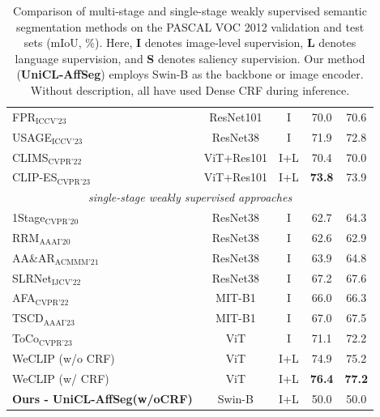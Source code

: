 \begin{table}[!t]
\begin{tabular}{l c c c c}
        FPR$_{\text{ICCV'23}}$~\cite{wsss_fpr}        & ResNet101  & I    & 70.0          & 70.6          \\
        USAGE$_{\text{ICCV'23}}$~\cite{wsss_usage}    & ResNet38   & I    & 71.9          & 72.8          \\
        CLIMS$_{\text{CVPR'22}}$~\cite{wsss_clims}    & ViT+Res101 & I+L  & 70.4          & 70.0          \\
        CLIP-ES$_{\text{CVPR'23}}$~\cite{wsss_clip_es}                       & ViT+Res101 & I+L  & \textbf{73.8} & 73.9          \\
        \hline
        \multicolumn{5}{c}{\textit{single-stage weakly supervised approaches}}                                                   \\
        1Stage$_{\text{CVPR'20}}$~\cite{wsss_single_stage}                   & ResNet38   & I    & 62.7          & 64.3          \\
        RRM$_{\text{AAAI'20}}$~\cite{wsss_reliability_does_matter}           & ResNet38   & I    & 62.6          & 62.9          \\
        AA\&AR$_{\text{ACMMM'21}}$~\cite{wsss_aaar}                                 & ResNet38   & I    & 63.9          & 64.8          \\
        SLRNet$_{\text{IJCV'22}}$~\cite{wsss_slr_net}                                  & ResNet38   & I    & 67.2          & 67.6          \\
        AFA$_{\text{CVPR'22}}$~\cite{wsss_afa_affinity_from_attention}                                     & MIT-B1     & I    & 66.0          & 66.3          \\
        TSCD$_{\text{AAAI'23}}$~\cite{wsss_tscd}                                    & MIT-B1     & I    & 67.0          & 67.5          \\
        ToCo$_{\text{CVPR'23}}$~\cite{wsss_toco_token_contrast}                                    & ViT        & I    & 71.1          & 72.2          \\
        WeCLIP (w/o CRF)                                                & ViT        & I+L  & 74.9          & 75.2          \\
        WeCLIP (w/ CRF)                                                 & ViT        & I+L  & \textbf{76.4} & \textbf{77.2} \\
        \hline
        \textbf{Ours - UniCL-AffSeg(w/oCRF)} & Swin-B & I+L & 50.0 & 50.0 \\
        \hline
    \end{tabular}
    \caption{
    Comparison of multi-stage and single-stage weakly supervised semantic segmentation methods on the PASCAL VOC 2012 validation and test sets (mIoU, \%). 
    Here, \textbf{I} denotes image-level supervision, \textbf{L} denotes language supervision, and \textbf{S} denotes saliency supervision. 
    Our method (\textbf{UniCL-AffSeg}) employs Swin-B as the backbone or image encoder. Without description, all have used Dense CRF during inference.
    }
    \label{tab:quantitative_results}
\end{table}


